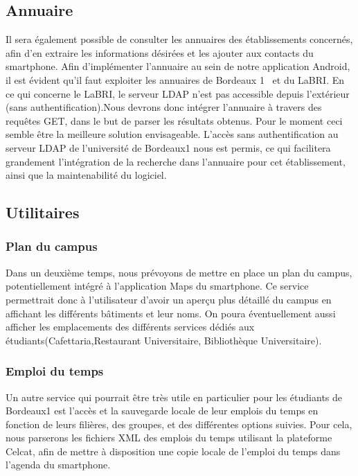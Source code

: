 \documentclass [pdftex,12pt] {report}
\begin{document}
\subsection{Annuaire}
Il sera également possible de consulter les annuaires des établissements concernés, afin d'en extraire les informations désirées et les ajouter aux contacts du smartphone.
Afin d'implémenter l'annuaire au sein de notre application Android, il est évident qu'il faut exploiter les annuaires de Bordeaux 1~\cite{AnnuaireBdx1} et du LaBRI. En ce qui concerne le LaBRI, le serveur LDAP n'est pas accessible depuis l'extérieur (sans authentification).Nous devrons donc intégrer l'annuaire à travers des requêtes GET, dans le but de parser les résultats obtenus. Pour le moment ceci semble être la meilleure solution envisageable. L'accès sans authentification au serveur LDAP de l'université de Bordeaux1 nous est permis, ce qui facilitera grandement l'intégration de la recherche dans l'annuaire pour cet établissement, ainsi que la maintenabilité du logiciel.


\subsection{Utilitaires}
\subsubsection{Plan du campus}
Dans un deuxième temps, nous prévoyons de mettre en place un plan du campus, potentiellement intégré à l'application Maps du smartphone.
Ce service permettrait donc à l'utilisateur d'avoir un aperçu plus détaillé du campus en affichant les différents bâtiments et leur noms.
On poura éventuellement aussi afficher les emplacements des différents services dédiés aux étudiants(Cafettaria,Restaurant Universitaire, Bibliothèque Universitaire).

\subsubsection{Emploi du temps}
Un autre service qui pourrait être très utile en particulier pour les étudiants de Bordeaux1 est l'accès et la sauvegarde locale de leur emplois du temps en fonction de leurs filières, des groupes, et des différentes options suivies. 
Pour cela, nous parserons les fichiers XML des emplois du temps utilisant la plateforme Celcat\cite{EdTxml}, afin de mettre à disposition une copie locale de l'emploi du temps dans l'agenda du smartphone.
\end{document}
